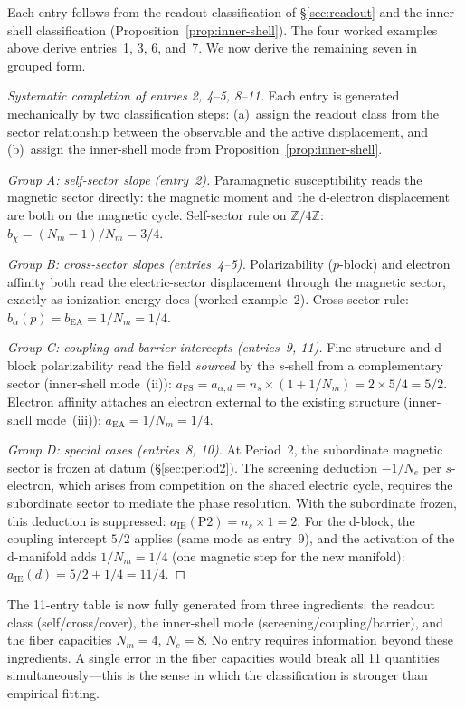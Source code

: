 \documentclass[11pt,a4paper]{article}
\begin{document}
Each entry follows from the readout classification of \S\ref{sec:readout} and the inner-shell classification (Proposition~\ref{prop:inner-shell}). The four worked examples above derive entries~1, 3, 6, and~7. We now derive the remaining seven in grouped form.

\begin{proof}[Systematic completion of entries 2, 4--5, 8--11]
Each entry is generated mechanically by two classification steps: (a)~assign the readout class from the sector relationship between the observable and the active displacement, and (b)~assign the inner-shell mode from Proposition~\ref{prop:inner-shell}.

\emph{Group A: self-sector slope (entry~2).} Paramagnetic susceptibility reads the magnetic sector directly: the magnetic moment and the d-electron displacement are both on the magnetic cycle. Self-sector rule on $\mathbb{Z}/4\mathbb{Z}$: $b_\chi = (N_m - 1)/N_m = 3/4$.

\emph{Group B: cross-sector slopes (entries~4--5).} Polarizability ($p$-block) and electron affinity both read the electric-sector displacement through the magnetic sector, exactly as ionization energy does (worked example~2). Cross-sector rule: $b_\alpha(p) = b_{\mathrm{EA}} = 1/N_m = 1/4$.

\emph{Group C: coupling and barrier intercepts (entries~9, 11).} Fine-structure and d-block polarizability read the field \emph{sourced} by the $s$-shell from a complementary sector (inner-shell mode~(ii)): $a_{\mathrm{FS}} = a_{\alpha,d} = n_s \times (1 + 1/N_m) = 2 \times 5/4 = 5/2$. Electron affinity attaches an electron external to the existing structure (inner-shell mode~(iii)): $a_{\mathrm{EA}} = 1/N_m = 1/4$.

\emph{Group D: special cases (entries~8, 10).} At Period~2, the subordinate magnetic sector is frozen at datum (\S\ref{sec:period2}). The screening deduction $-1/N_e$ per $s$-electron, which arises from competition on the shared electric cycle, requires the subordinate sector to mediate the phase resolution. With the subordinate frozen, this deduction is suppressed: $a_{\mathrm{IE}}(\mathrm{P2}) = n_s \times 1 = 2$. For the d-block, the coupling intercept $5/2$ applies (same mode as entry~9), and the activation of the d-manifold adds $1/N_m = 1/4$ (one magnetic step for the new manifold): $a_{\mathrm{IE}}(d) = 5/2 + 1/4 = 11/4$.
\end{proof}

The 11-entry table is now fully generated from three ingredients: the readout class (self/\allowbreak cross/\allowbreak cover), the inner-shell mode (screening/\allowbreak coupling/\allowbreak barrier), and the fiber capacities $N_m = 4$, $N_e = 8$. No entry requires information beyond these ingredients. A single error in the fiber capacities would break all 11 quantities simultaneously---this is the sense in which the classification is stronger than empirical fitting.
\end{document}

